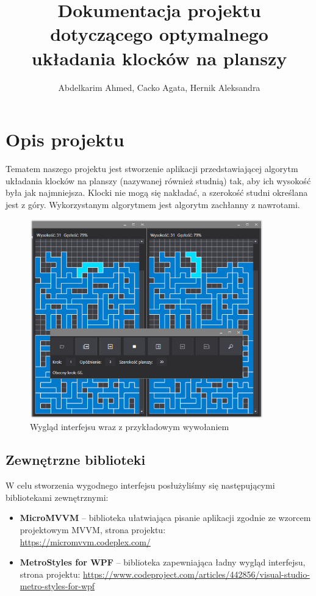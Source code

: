 \documentclass{article}
\title{Dokumentacja projektu dotyczącego optymalnego układania klocków na planszy}
\author{Abdelkarim Ahmed, Cacko Agata, Hernik Aleksandra}
\begin{document}
\maketitle
\section{Opis projektu}
Tematem naszego projektu jest stworzenie aplikacji przedstawiającej algorytm układania klocków na planszy (nazywanej również studnią) tak, aby ich wysokość była jak najmniejsza. Klocki nie mogą się nakładać, a szerokość studni określana jest z góry. Wykorzystanym algorytmem jest algorytm zachłanny z nawrotami.



\begin{figure}[H]
\begin{center}
\includegraphics[width=0.9\textwidth]{interfejs.png}
\end{center}
\vspace{-0.3cm}
\caption{Wygląd interfejsu wraz z przykładowym wywołaniem}
\end{figure}



\subsection{Zewnętrzne biblioteki}

W celu stworzenia wygodnego interfejsu posłużyliśmy się następującymi bibliotekami zewnętrznymi:


\begin{itemize}
\item \textbf{MicroMVVM} -- biblioteka ułatwiająca pisanie aplikacji zgodnie ze wzorcem projektowym MVVM, strona projektu: \\ \url{https://micromvvm.codeplex.com/}
\item \textbf{MetroStyles for WPF} -- biblioteka zapewniająca ładny wygląd interfejsu, strona projektu: \url{https://www.codeproject.com/articles/442856/visual-studio-metro-styles-for-wpf}
\end{itemize}
\end{document}
